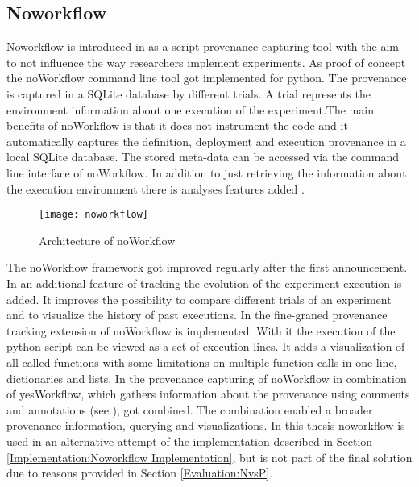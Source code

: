 \documentclass[draft,final]{vutinfth} %
\begin{document}
\subsection{Noworkflow}\label{Noworkflow}
Noworkflow is introduced in \cite{c9e0604becba42af96a9cb0a6f60018b} as a script provenance capturing tool with the aim to not influence the way researchers implement experiments. As proof of concept the noWorkflow command line tool got implemented for python. The provenance is captured in a SQLite database by different trials. A trial represents the environment information about one execution of the experiment.The main benefits of noWorkflow is that it does not instrument the code and it automatically captures the definition, deployment and execution provenance in a local SQLite database. The stored meta-data can be accessed via the command line interface of noWorkflow. In addition to just retrieving the information about the execution environment there is analyses features added \cite{c9e0604becba42af96a9cb0a6f60018b}.

\begin{figure}[h]
	\centering
	\texttt{[image: noworkflow]}
	\caption{Architecture of noWorkflow \cite{c9e0604becba42af96a9cb0a6f60018b}}
	\label{fig:noworkflow} %
\end{figure}

The noWorkflow framework got improved regularly after the first announcement. In \cite{Pimentel2016TrackingAA} an additional feature of tracking the evolution of the experiment execution is added. It improves the possibility to compare different trials of an experiment and to visualize the history of past executions. In \cite{Pimentel:2016:FPC:3090188.3090214} the fine-graned provenance tracking extension of noWorkflow is implemented. With it the execution of the python script can be viewed as a set of execution lines. It adds a visualization of all called functions with some limitations on multiple function calls in one line, dictionaries and lists. In \cite{69bac1252a684629baa43b48e350068d} the provenance capturing of noWorkflow in combination of yesWorkflow, which gathers information about the provenance using comments and annotations (see \cite{192094}), got combined. The combination enabled a broader provenance information, querying and visualizations. 
In this thesis noworkflow is used in an alternative attempt of the implementation described in Section \ref{Implementation:Noworkflow Implementation}, but is not part of the final solution due to reasons provided in Section \ref{Evaluation:NvsP}.
\end{document}
